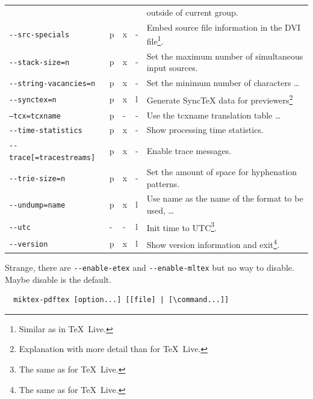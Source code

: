 \documentclass[a4paper]{article}%
\newcommand{\pdflatex}{\texttt{pdflatex}}
\newcommand{\texlive}{\TeX~Live}
\begin{document}
{\begin{longtable}{lllll}
                                      &  & &        & outside of current group. \\
\texttt{-{}-src-specials}             & p&x&- & Embed source file information in the DVI file\footnote%
{Similar as in \texlive. }. \\
\texttt{-{}-stack-size=n}             & p&x&- & Set the maximum number of simultaneous input sources. \\
\texttt{-{}-string-vacancies=n}       & p&x&- & Set the minimum number of characters \dots \\
\texttt{-{}-synctex=n}                & p&x&l & Generate SyncTeX data for previewers\footnote%
{Explanation with more detail than for \texlive. } \\
\texttt{--tcx=tcxname}                & p&-&- & Use the tcxname translation table \dots \\
\texttt{-{}-time-statistics}          & p&x&- & Show processing time statistics. \\
\texttt{-{}-trace[=tracestreams]}     & p&x&- & Enable trace messages. \\
\texttt{-{}-trie-size=n}              & p&x&- & Set the amount of space for hyphenation patterns. \\
\texttt{-{}-undump=name}              & p&x&l       & Use name as the name of the format to be used, \dots \\
\texttt{-{}-utc}                      & -&-&l & Init time to UTC\footnote%
   {The same as for \texlive. }.  \\
\texttt{-{}-version}                  & p&x&l       & Show version information and exit\footnote%
{The same as for \texlive. }. \\
\end{longtable}
}

Strange, there are \texttt{-{}-enable-etex} and \texttt{-{}-enable-mltex} 
but no way to disable. 
Maybe disable is the default. 

\begin{verbatim}
  miktex-pdftex [option...] [[file] | [\command...]]
\end{verbatim}

\end{document}
